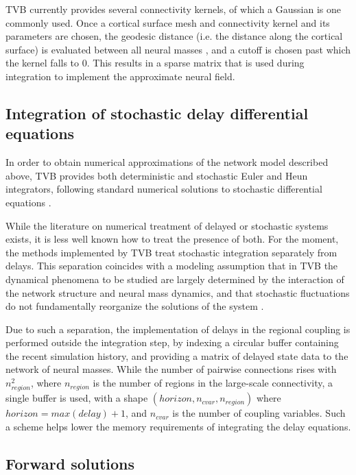 \documentclass{bioinfo}
\begin{document}
TVB currently provides several connectivity kernels, of which a Gaussian
is one commonly used. Once a cortical surface mesh 
and connectivity kernel and its parameters are chosen, the geodesic
distance (i.e. the distance along the cortical surface) is evaluated
between all neural masses \citep{Mitchell1987}, and a cutoff is chosen
past which the kernel falls to 0. This results in a sparse matrix that 
is used during integration to implement the approximate neural field. 

\subsection{Integration of stochastic delay differential equations}

In order to obtain numerical approximations of the network model 
described above, TVB provides both deterministic and stochastic
Euler and Heun integrators,
following standard numerical solutions to stochastic
differential equations \citep{Kloeden_1995,Mannella_2002,Mannella_1989}.

While the literature on numerical treatment of delayed or 
stochastic systems exists, it is less well known how to treat 
the presence of both. For the moment, the methods implemented by TVB
treat stochastic integration separately from delays. 
This separation coincides with a modeling assumption that in
TVB the dynamical phenomena to be studied are largely determined
by the interaction of the network structure and neural mass dynamics, 
and that stochastic fluctuations do not fundamentally reorganize the
solutions of the system \citep{Ghosh_2008,Deco_2009,Deco_2011,Deco_Senden_2012}.

Due to such a separation, the implementation of delays in the
regional coupling is performed outside the integration step,
by indexing a circular buffer containing the recent simulation 
history, and providing a matrix of delayed state data to the 
network of neural masses. While the number of pairwise
connections rises with $n_{region}^2$, where $n_{region}$ is
the number of regions in the large-scale connectivity, 
a single buffer is used, with a shape
$(horizon, n_{cvar}, n_{region})$ where $horizon = max(delay) + 1$,
and
$n_{cvar}$ is the number of coupling variables. Such a scheme helps 
lower the memory requirements of integrating the delay equations.

\subsection{Forward solutions}
\end{document}
